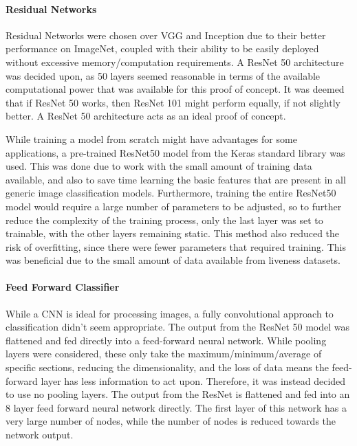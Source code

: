 \documentclass[12pt,a4paper]{article}
\begin{document}
                \paragraph{Residual Networks}
                Residual Networks were chosen over VGG and Inception due to their better performance on ImageNet, coupled with their ability to be easily deployed without excessive memory/computation requirements.
                A ResNet 50 architecture was decided upon, as 50 layers seemed reasonable in terms of the available computational power that was available for this proof of concept. It was deemed that if ResNet 50 works, then ResNet 101 might perform equally, if not slightly better. A ResNet 50 architecture acts as an ideal proof of concept.

                While training a model from scratch might have advantages for some applications, a pre-trained ResNet50 model from the Keras standard library was used. This was done due to work with the small amount of training data available, and also to save time learning the basic features that are present in all generic image classification models. Furthermore, training the entire ResNet50 model would require a large number of parameters to be adjusted, so to further reduce the complexity of the training process, only the last layer was set to trainable, with the other layers remaining static. This method also reduced the risk of overfitting, since there were fewer parameters that required training. This was beneficial due to the small amount of data available from liveness datasets.

                \paragraph{Feed Forward Classifier}
                While a CNN is ideal for processing images, a fully convolutional approach to classification didn't seem appropriate. The output from the ResNet 50 model was flattened and fed directly into a feed-forward neural network.
                While pooling layers were considered, these only take the maximum/minimum/average of specific sections, reducing the dimensionality, and the loss of data means the feed-forward layer has less information to act upon. Therefore,
                it was instead decided to use no pooling layers. The output from the ResNet is flattened and fed into an 8 layer feed forward neural network directly. The first layer of this network has a very large number of nodes,
                while the number of nodes is reduced towards the network output.
                
\end{document}
